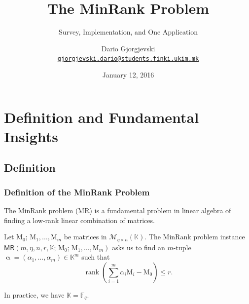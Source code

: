 \documentclass[serif, hyperref={unicode, breaklinks}, xcolor={x11names, psnames,
  dvipsnames, table}, usepdftitle=false]{beamer}
\DeclareMathOperator{\rank}{rank}
\newcommand{\MR}{\ensuremath{\mathsf{MR}}}
\renewcommand*{\vec}[1]{\bm{\mathrm{#1}}}
\newcommand{\matr}[1]{\bm{\mathrm{#1}}}
\begin{document}
\title[MinRank]{The MinRank Problem}
\subtitle{Survey, Implementation, and One Application}
\author[D.~Gjorgjevski]{Dario Gjorgjevski\\
  \texttt{\href{mailto:gjorgjevski.dario@students.finki.ukim.mk}
    {gjorgjevski.dario@students.finki.ukim.mk}}}
\date[2016-01-12]{January 12, 2016}


\begin{frame}
  \titlepage
\end{frame}

\section{Definition and Fundamental Insights}
\subsection{Definition}
\begin{frame}
  \frametitle{Definition of the MinRank Problem}
  The MinRank problem (MR) is a fundamental problem in linear algebra
  of finding a low-rank linear combination of matrices.
  \begin{definition}\label{def:mr}
    Let $\matr{M}_0;\, \matr{M}_1, \ldots, \matr{M}_m$ be matrices in
    $\mathcal{M}_{\eta \times n}(\mathbb{K})$.  The MinRank problem instance
    $\MR\left(m, \eta, n, r, \mathbb{K};\, \matr{M}_0;\, \matr{M}_1, \ldots,
      \matr{M}_m\right)$ asks us to find an $m$-tuple
    $\vec{\upalpha} = (\alpha_1, \ldots, \alpha_m) \in \mathbb{K}^m$ such that
    $$
    \rank\left(\sum\limits_{i = 1}^{m} \alpha_i \matr{M}_i - \matr{M}_0\right) \le
    r\text{.}
    $$
  \end{definition}
  In practice, we have $\mathbb{K} = \mathbb{F}_q$.
\end{frame}
\end{document}

